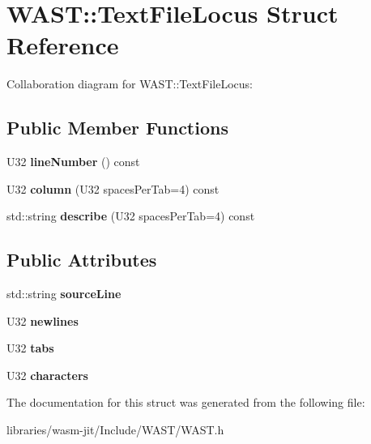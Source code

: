 \hypertarget{struct_w_a_s_t_1_1_text_file_locus}{}\section{W\+A\+ST\+:\+:Text\+File\+Locus Struct Reference}
\label{struct_w_a_s_t_1_1_text_file_locus}


Collaboration diagram for W\+A\+ST\+:\+:Text\+File\+Locus\+:
\subsection*{Public Member Functions}
\begin{DoxyCompactItemize}
\item 
\mbox{\label{struct_w_a_s_t_1_1_text_file_locus_ae8fb5a9f1c5b36e80ad283768e0fbf45}} 
U32 {\bfseries line\+Number} () const
\item 
\mbox{\label{struct_w_a_s_t_1_1_text_file_locus_abd689a28a24904ee2993732abc9ed6e3}} 
U32 {\bfseries column} (U32 spaces\+Per\+Tab=4) const
\item 
\mbox{\label{struct_w_a_s_t_1_1_text_file_locus_a6a1645bd22ae8a3b5f318b0975b5abd8}} 
std\+::string {\bfseries describe} (U32 spaces\+Per\+Tab=4) const
\end{DoxyCompactItemize}
\subsection*{Public Attributes}
\begin{DoxyCompactItemize}
\item 
\mbox{\label{struct_w_a_s_t_1_1_text_file_locus_ab195429c5005d472161a01e7589a4e2b}} 
std\+::string {\bfseries source\+Line}
\item 
\mbox{\label{struct_w_a_s_t_1_1_text_file_locus_a336daf8b9f47f2dafcad2fe97ed15ae3}} 
U32 {\bfseries newlines}
\item 
\mbox{\label{struct_w_a_s_t_1_1_text_file_locus_af8a4c8fb588e6e8869481c603a40f2c4}} 
U32 {\bfseries tabs}
\item 
\mbox{\label{struct_w_a_s_t_1_1_text_file_locus_a3dfa23b789fc44bd8f91bdc2dcdcf4b6}} 
U32 {\bfseries characters}
\end{DoxyCompactItemize}


The documentation for this struct was generated from the following file\+:\begin{DoxyCompactItemize}
\item 
libraries/wasm-\/jit/\+Include/\+W\+A\+S\+T/W\+A\+S\+T.\+h\end{DoxyCompactItemize}
